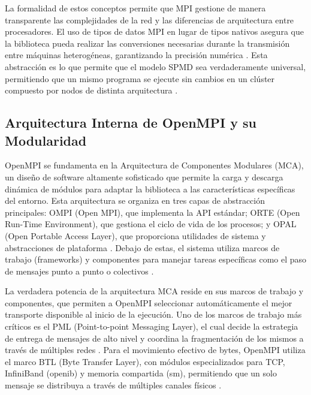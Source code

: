 La formalidad de estos conceptos permite que MPI gestione de manera transparente las complejidades de la red y las diferencias de arquitectura entre procesadores. El uso de tipos de datos MPI en lugar de tipos nativos asegura que la biblioteca pueda realizar las conversiones necesarias durante la transmisión entre máquinas heterogéneas, garantizando la precisión numérica \cite{ref1_cristian_MPIStandard41}. Esta abstracción es lo que permite que el modelo SPMD sea verdaderamente universal, permitiendo que un mismo programa se ejecute sin cambios en un clúster compuesto por nodos de distinta arquitectura \cite{ref3_cristian_Walker1992, ref9_cristian_Gropp1996}.

\subsection{Arquitectura Interna de OpenMPI y su Modularidad}

OpenMPI se fundamenta en la Arquitectura de Componentes Modulares (MCA), un diseño de software altamente sofisticado que permite la carga y descarga dinámica de módulos para adaptar la biblioteca a las características específicas del entorno. Esta arquitectura se organiza en tres capas de abstracción principales: OMPI (Open MPI), que implementa la API estándar; ORTE (Open Run-Time Environment), que gestiona el ciclo de vida de los procesos; y OPAL (Open Portable Access Layer), que proporciona utilidades de sistema y abstracciones de plataforma \cite{ref7_cristian_Squyres2004, ref4_cristian_Graham2005}. Debajo de estas, el sistema utiliza marcos de trabajo (frameworks) y componentes para manejar tareas específicas como el paso de mensajes punto a punto o colectivos \cite{ref7_cristian_Squyres2004, ref10_cristian_Ammendola2012}.

La verdadera potencia de la arquitectura MCA reside en sus marcos de trabajo y componentes, que permiten a OpenMPI seleccionar automáticamente el mejor transporte disponible al inicio de la ejecución. Uno de los marcos de trabajo más críticos es el PML (Point-to-point Messaging Layer), el cual decide la estrategia de entrega de mensajes de alto nivel y coordina la fragmentación de los mismos a través de múltiples redes \cite{ref5_cristian_Graham2006, ref10_cristian_Ammendola2012}. Para el movimiento efectivo de bytes, OpenMPI utiliza el marco BTL (Byte Transfer Layer), con módulos especializados para TCP, InfiniBand (openib) y memoria compartida (sm), permitiendo que un solo mensaje se distribuya a través de múltiples canales físicos \cite{ref7_cristian_Squyres2004, ref10_cristian_Ammendola2012}.

